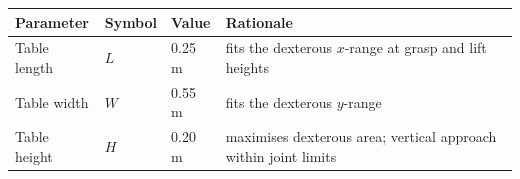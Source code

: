 \begin{tabular}{llll}\hline Parameter & Symbol & Value & Rationale\\\hline
Table length & $L$ & 0.25 m & fits the dexterous $x$-range at grasp and lift heights\\
Table width & $W$ & 0.55 m & fits the dexterous $y$-range\\
Table height & $H$ & 0.20 m & maximises dexterous area; vertical approach within joint limits\\\hline\end{tabular}
